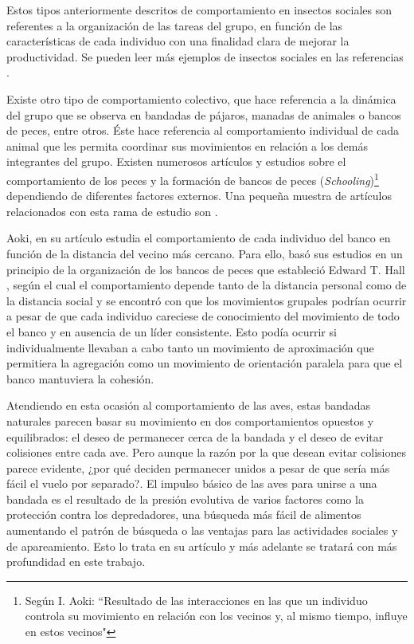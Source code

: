 Estos tipos anteriormente descritos de comportamiento en insectos sociales son referentes a la organización de las tareas del grupo, en función de las características de cada individuo con una finalidad clara de mejorar la productividad. Se pueden leer más ejemplos de insectos sociales en las referencias \cite{csahin2004swarm,robinson1992regulation}. 

Existe otro tipo de comportamiento colectivo, que hace referencia a la dinámica del grupo que se observa en bandadas de pájaros, manadas de animales o bancos de peces, entre otros. Éste hace referencia al comportamiento individual de cada animal que les permita coordinar sus movimientos en relación a los demás integrantes del grupo. Existen numerosos artículos y estudios sobre el comportamiento de los peces y la formación de bancos de peces (\textit{Schooling})\footnote{Según I. Aoki: ``Resultado de las interacciones en las que un individuo controla su movimiento en relación con los vecinos y, al mismo tiempo, influye en estos vecinos"} dependiendo de diferentes factores externos. Una pequeña muestra de artículos relacionados con esta rama de estudio son \cite{aoki1982simulation, Aoki1984experimental,hall1910hidden,partridge1980sensory,partridge1980three,Pitcher963blindfish,youseff2008parallel}. 

Aoki, en su artículo \cite{aoki1982simulation} estudia el comportamiento de cada individuo del banco en función de la distancia del vecino más cercano. Para ello, basó sus estudios en un principio de la organización de los bancos de peces que estableció Edward T. Hall \cite{hall1910hidden}, según el cual el comportamiento depende tanto de la distancia personal como de la distancia social y se encontró con que los movimientos grupales podrían ocurrir a pesar de que cada individuo careciese de conocimiento del movimiento de todo el banco y en ausencia de un líder consistente. Esto podía ocurrir si individualmente llevaban a cabo tanto un movimiento de aproximación que permitiera la agregación como un movimiento de orientación paralela para que el banco mantuviera la cohesión.

Atendiendo en esta ocasión al comportamiento de las aves, estas bandadas naturales parecen basar su movimiento en dos comportamientos opuestos y equilibrados: el deseo de permanecer cerca de la bandada y el deseo de evitar colisiones entre cada ave. Pero aunque la razón por la que desean evitar colisiones parece evidente, ¿por qué deciden permanecer unidos a pesar de que sería más fácil el vuelo por separado?. El impulso básico de las aves para unirse a una bandada es el resultado de la presión evolutiva de varios factores como la protección contra los depredadores, una búsqueda más fácil de alimentos aumentando el patrón de búsqueda o las ventajas para las actividades sociales y de apareamiento. Esto lo trata \citeauthor{reynolds1987flocks} en su artículo \cite{reynolds1987flocks} y más adelante se tratará con más profundidad en este trabajo.


